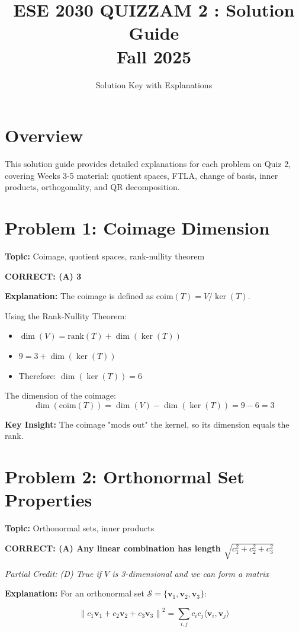\documentclass[12pt]{amsart}
\title{ESE 2030 QUIZZAM 2 : Solution Guide\\Fall 2025}
\author{Solution Key with Explanations}
\newcommand{\correct}[1]{{\color{blue}\textbf{CORRECT: #1}}}
\newcommand{\partcred}[1]{{\color{red}\textit{Partial Credit: #1}}}
\newcommand{\hint}{\textbf{Key Insight: }}
\begin{document}
\maketitle

\section*{Overview}
This solution guide provides detailed explanations for each problem on Quiz 2, covering Weeks 3-5 material: quotient spaces, FTLA, change of basis, inner products, orthogonality, and QR decomposition.

\hrulefill

\section*{Problem 1: Coimage Dimension}
\textbf{Topic:} Coimage, quotient spaces, rank-nullity theorem

\correct{(A) 3}

\textbf{Explanation:} 
The coimage is defined as $\text{coim}(T) = V/\ker(T)$.

Using the Rank-Nullity Theorem:
\begin{itemize}
\item $\dim(V) = \text{rank}(T) + \dim(\ker(T))$
\item $9 = 3 + \dim(\ker(T))$
\item Therefore: $\dim(\ker(T)) = 6$
\end{itemize}

The dimension of the coimage:
$$\dim(\text{coim}(T)) = \dim(V) - \dim(\ker(T)) = 9 - 6 = 3$$

\hint The coimage "mods out" the kernel, so its dimension equals the rank.

\hrulefill

\section*{Problem 2: Orthonormal Set Properties}
\textbf{Topic:} Orthonormal sets, inner products

\correct{(A) Any linear combination has length $\sqrt{c_1^2 + c_2^2 + c_3^2}$}

\partcred{(D) True if $V$ is 3-dimensional and we can form a matrix}

\textbf{Explanation:} 
For an orthonormal set $\mathcal{S} = \{\mathbf{v}_1, \mathbf{v}_2, \mathbf{v}_3\}$:

$$\left\|c_1\mathbf{v}_1 + c_2\mathbf{v}_2 + c_3\mathbf{v}_3\right\|^2 = \sum_{i,j} c_ic_j\langle\mathbf{v}_i, \mathbf{v}_j\rangle$$
\end{document}
